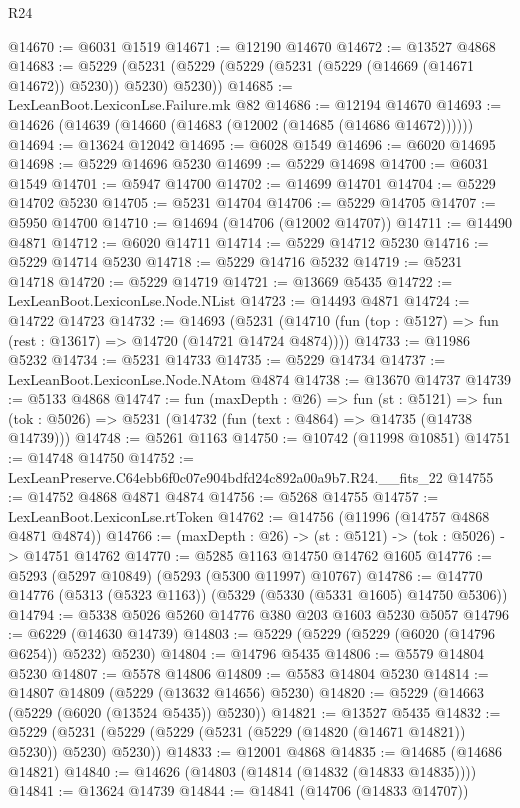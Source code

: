 \begin{lexlean}{R24}
\begin{coremodule}
@14670 := @6031 @1519
@14671 := @12190 @14670
@14672 := @13527 @4868
@14683 := @5229 (@5231 (@5229 (@5229 (@5231 (@5229 (@14669 (@14671 @14672)) @5230)) @5230) @5230))
@14685 := LexLeanBoot.LexiconLse.Failure.mk @82
@14686 := @12194 @14670
@14693 := @14626 (@14639 (@14660 (@14683 (@12002 (@14685 (@14686 @14672))))))
@14694 := @13624 @12042
@14695 := @6028 @1549
@14696 := @6020 @14695
@14698 := @5229 @14696 @5230
@14699 := @5229 @14698
@14700 := @6031 @1549
@14701 := @5947 @14700
@14702 := @14699 @14701
@14704 := @5229 @14702 @5230
@14705 := @5231 @14704
@14706 := @5229 @14705
@14707 := @5950 @14700
@14710 := @14694 (@14706 (@12002 @14707))
@14711 := @14490 @4871
@14712 := @6020 @14711
@14714 := @5229 @14712 @5230
@14716 := @5229 @14714 @5230
@14718 := @5229 @14716 @5232
@14719 := @5231 @14718
@14720 := @5229 @14719
@14721 := @13669 @5435
@14722 := LexLeanBoot.LexiconLse.Node.NList
@14723 := @14493 @4871
@14724 := @14722 @14723
@14732 := @14693
    (@5231 (@14710 (fun (top : @5127) => fun (rest : @13617) => @14720 (@14721 @14724 @4874))))
@14733 := @11986 @5232
@14734 := @5231 @14733
@14735 := @5229 @14734
@14737 := LexLeanBoot.LexiconLse.Node.NAtom @4874
@14738 := @13670 @14737
@14739 := @5133 @4868
@14747 := fun (maxDepth : @26) =>
  fun (st : @5121) =>
  fun (tok : @5026) => @5231 (@14732 (fun (text : @4864) => @14735 (@14738 @14739)))
@14748 := @5261 @1163
@14750 := @10742 (@11998 @10851)
@14751 := @14748 @14750
@14752 := LexLeanPreserve.C64ebb6f0c07e904bdfd24c892a00a9b7.R24.__fits_22
@14755 := @14752 @4868 @4871 @4874
@14756 := @5268 @14755
@14757 := LexLeanBoot.LexiconLse.rtToken
@14762 := @14756 (@11996 (@14757 @4868 @4871 @4874))
@14766 := (maxDepth : @26) -> (st : @5121) -> (tok : @5026) -> @14751 @14762
@14770 := @5285 @1163 @14750 @14762 @1605
@14776 := @5293 (@5297 @10849) (@5293 (@5300 @11997) @10767)
@14786 := @14770 @14776 (@5313 (@5323 @1163)) (@5329 (@5330 (@5331 @1605) @14750 @5306))
@14794 := @5338 @5026 @5260 @14776 @380 @203 @1603 @5230 @5057
@14796 := @6229 (@14630 @14739)
@14803 := @5229 (@5229 (@5229 (@6020 (@14796 @6254)) @5232) @5230)
@14804 := @14796 @5435
@14806 := @5579 @14804 @5230
@14807 := @5578 @14806
@14809 := @5583 @14804 @5230
@14814 := @14807 @14809 (@5229 (@13632 @14656) @5230)
@14820 := @5229 (@14663 (@5229 (@6020 (@13524 @5435)) @5230))
@14821 := @13527 @5435
@14832 := @5229 (@5231 (@5229 (@5229 (@5231 (@5229 (@14820 (@14671 @14821)) @5230)) @5230) @5230))
@14833 := @12001 @4868
@14835 := @14685 (@14686 @14821)
@14840 := @14626 (@14803 (@14814 (@14832 (@14833 @14835))))
@14841 := @13624 @14739
@14844 := @14841 (@14706 (@14833 @14707))

\end{coremodule}
\end{lexlean}
